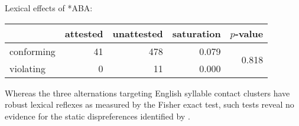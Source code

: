 \ex Lexical effects of \textsc{*ABA}: \vspace{6pt} \\
\begin{tabular}{l r r r r}
\toprule
           & attested & unattested & saturation & $p$-value \\
\midrule
conforming & 41 & 478 & 0.079 & \multirow{2}{*}{0.818} \\
violating  &  0 &  11 & 0.000 \\
\bottomrule
\end{tabular}
\xe

Whereas the three alternations targeting English syllable contact clusters have robust lexical reflexes as measured by the Fisher exact test, such tests reveal no evidence for the static dispreferences identified by \citeauthor{Pierrehumbert1994}.

%
%
